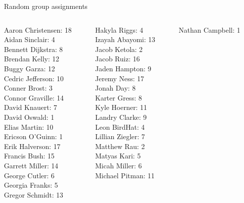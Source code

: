 \documentclass[10pt]{beamer}
\begin{document}
\begin{frame}{Random group assignments}
\footnotesize
\begin{columns}
\begin{column}{0.33\textwidth}
Aaron Christensen: 18 \\ 
Aidan Sinclair: 4 \\ 
Bennett Dijkstra: 8 \\ 
Brendan Kelly: 12 \\ 
Buggy Garza: 12 \\ 
Cedric Jefferson: 10 \\ 
Conner Brost: 3 \\ 
Connor Graville: 14 \\ 
David Knauert: 7 \\ 
David Oswald: 1 \\ 
Elias Martin: 10 \\ 
Ericson O'Guinn: 1 \\ 
Erik Halverson: 17 \\ 
Francis Bush: 15 \\ 
Garrett Miller: 14 \\ 
George Cutler: 6 \\ 
Georgia Franks: 5 \\ 
Gregor Schmidt: 13 \\\end{column}
\begin{column}{0.33\textwidth}
Hakyla Riggs: 4 \\ 
Izayah Abayomi: 13 \\ 
Jacob Ketola: 2 \\ 
Jacob Ruiz: 16 \\ 
Jaden Hampton: 9 \\ 
Jeremy Ness: 17 \\ 
Jonah Day: 8 \\ 
Karter Gress: 8 \\ 
Kyle Hoerner: 11 \\ 
Landry Clarke: 9 \\ 
Leon BirdHat: 4 \\ 
Lillian Ziegler: 7 \\ 
Matthew Rau: 2 \\ 
Matyas Kari: 5 \\ 
Micah Miller: 6 \\ 
Michael Pitman: 11 \\\end{column}
\begin{column}{0.33\textwidth}
Nathan Campbell: 1 \\ 

\end{column}
\end{columns}
\end{frame}
\end{document}
